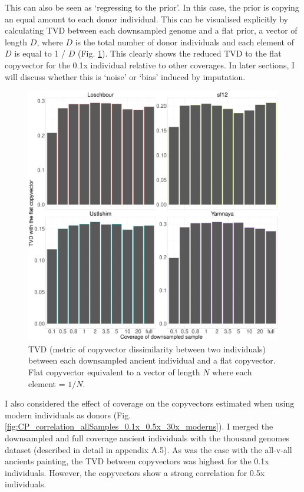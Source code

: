 This can also be seen as `regressing to the prior'. In this case, the prior is copying an equal amount to each donor individual. This can be visualised explicitly by calculating TVD between each downsampled genome and a flat prior, a vector of length $D$, where $D$ is the total number of donor individuals and each element of $D$ is equal to 1 / $D$ (Fig. \ref{fig:TVD_ancients_flat_prior}). This clearly shows the reduced TVD to the flat copyvector for the 0.1x individual relative to other coverages. In later sections, I will discuss whether this is `noise' or `bias' induced by imputation. 

\begin{figure}[htp]
    \centering
    \includegraphics[width=1.0\textwidth]{../images/chapter1/TVD_ancients_flat_prior.pdf}
    \caption{TVD (metric of copyvector dissimilarity between two individuals) between each downsampled ancient individual and a flat copyvector. Flat copyvector equivalent to a vector of length $N$ where each element = $1/N$.}
    \label{fig:TVD_ancients_flat_prior}
\end{figure}

I also considered the effect of coverage on the copyvectors estimated when using modern individuals as donors (Fig. \ref{fig:CP_correlation_allSamples_0.1x_0.5x_30x_moderns}). I merged the downsampled and full coverage ancient individuals with the thousand genomes dataset (described in detail in appendix A.5). As was the case with the all-v-all ancients painting, the TVD between copyvectors was highest for the 0.1x individuals. However, the copyvectors show a strong correlation for 0.5x individuals. 

